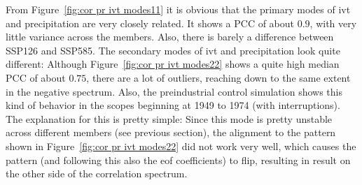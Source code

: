 From Figure~\ref{fig:cor pr ivt modes11} it is obvious that the primary modes of \ac{ivt} and precipitation are very closely related. 
It shows a PCC of about $0.9$, with very little variance across the members. 
Also, there is barely a difference between SSP126 and SSP585. 
The secondary modes of \ac{ivt} and precipitation look quite different: 
Although Figure~\ref{fig:cor pr ivt modes22} shows a quite high median PCC of about $0.75$, there are a lot of outliers, reaching down to the same extent in the negative spectrum. 
Also, the preindustrial control simulation shows this kind of behavior in the scopes beginning at 1949 to 1974 (with interruptions). 
The explanation for this is pretty simple: Since this mode is pretty unstable across different members (see previous section), the alignment to the pattern shown in Figure~\ref{fig:cor pr ivt modes22} did not work very well, which causes the pattern (and following this also the \ac{eof} coefficients) to flip, resulting in result on the other side of the correlation spectrum. 



